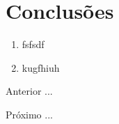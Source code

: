 \section{Conclusões}


\begin{enumerate}[label=\Roman{*}, ref=(\roman{*})]
  \item fsfsdf
  \item kugfhiuh
\end{enumerate}

\begin{asparaenum}
\item Anterior ... \cite{ninguem2022curioso}
\item Próximo ... \label{pl1}
\end{asparaenum}



